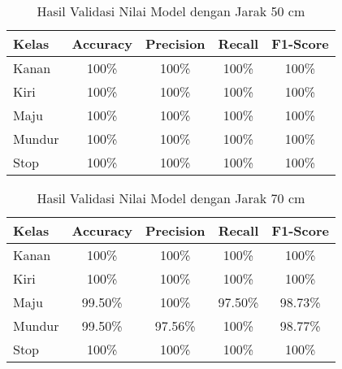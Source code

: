\begin{table}[ht]
  \caption{Hasil Validasi Nilai Model dengan Jarak 50 cm}
  \label{tb:50cm}
  \centering
  \begin{tabular}{|l|c|c|c|c|}
  \hline
  \rowcolor[HTML]{C0C0C0} 
  \textbf{Kelas} & \textbf{Accuracy} & \textbf{Precision} & \textbf{Recall} & \textbf{F1-Score} \\ \hline
  Kanan    & 100\%            & 100\%             & 100\%           & 100\%            \\ \hline
  Kiri     & 100\%          & 100\%           & 100\%           & 100\%           \\ \hline
  Maju      & 100\%          & 100\%           & 100\%          & 100\%          \\ \hline
  Mundur     & 100\%            & 100\%             & 100\%           & 100\%            \\ \hline
  Stop  & 100\%            & 100\%             & 100\%           & 100\%            \\ \hline
  \end{tabular}
\end{table}

\begin{table}[ht]
  \caption{Hasil Validasi Nilai Model dengan Jarak 70 cm}
  \label{tb:70cm}
  \centering
  \begin{tabular}{|l|c|c|c|c|}
  \hline
  \rowcolor[HTML]{C0C0C0} 
  \textbf{Kelas} & \textbf{Accuracy} & \textbf{Precision} & \textbf{Recall} & \textbf{F1-Score} \\ \hline
  Kanan    & 100\%            & 100\%             & 100\%           & 100\%            \\ \hline
  Kiri     & 100\%          & 100\%           & 100\%           & 100\%           \\ \hline
  Maju      & 99.50\%          & 100\%           & 97.50\%          & 98.73\%          \\ \hline
  Mundur     & 99.50\%            & 97.56\%             & 100\%           & 98.77\%            \\ \hline
  Stop  & 100\%            & 100\%             & 100\%           & 100\%            \\ \hline
  \end{tabular}
\end{table}

